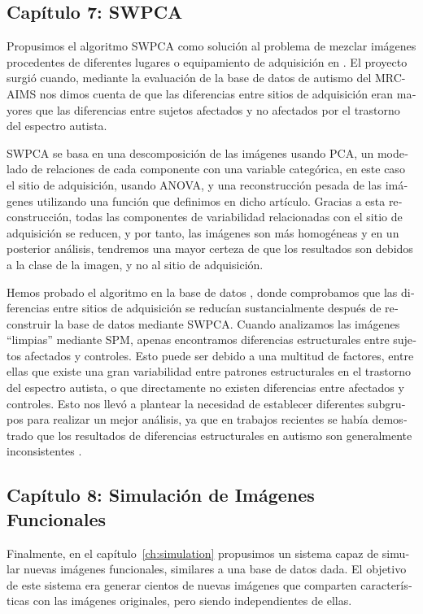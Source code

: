 \begin{otherlanguage}{spanish}
\subsection*{Capítulo 7: \acf{SWPCA}}
Propusimos el algoritmo \acf{SWPCA} como solución al problema de mezclar imágenes procedentes de diferentes lugares o equipamiento de adquisición en \cite{Martinez-Murcia2016a}. El proyecto surgió cuando, mediante la evaluación de la base de datos de autismo del \ac{MRC-AIMS} nos dimos cuenta de que las diferencias entre sitios de adquisición eran mayores que las diferencias entre sujetos afectados y no afectados por el trastorno del espectro autista. 

\acs{SWPCA} se basa en una descomposición de las imágenes usando \acs{PCA}, un modelado de relaciones de cada componente con una variable categórica, en este caso el sitio de adquisición, usando \acf{ANOVA}, y una reconstrucción pesada de las imágenes utilizando una función que definimos en dicho artículo. Gracias a esta reconstrucción, todas las componentes de variabilidad relacionadas con el sitio de adquisición se reducen, y por tanto, las imágenes son más homogéneas y en un posterior análisis, tendremos una mayor certeza de que los resultados son debidos a la clase de la imagen, y no al sitio de adquisición. 

Hemos probado el algoritmo en la base de datos \aimsmri{}, donde comprobamos que las diferencias entre sitios de adquisición se reducían sustancialmente después de reconstruir la base de datos mediante \ac{SWPCA}. Cuando analizamos las imágenes ``limpias'' mediante \acs{SPM}, apenas encontramos diferencias estructurales entre sujetos afectados y controles. Esto puede ser debido a una multitud de factores, entre ellas que existe una gran variabilidad entre patrones estructurales en el trastorno del espectro autista, o que directamente no existen diferencias entre afectados y controles. Esto nos llevó a plantear la necesidad de establecer diferentes subgrupos para realizar un mejor análisis, ya que en trabajos recientes se había demostrado que los resultados de diferencias estructurales en autismo son generalmente inconsistentes \cite{haar2014anatomical}. 

\subsection*{Capítulo 8: Simulación de Imágenes Funcionales}
Finalmente, en el capítulo~\ref{ch:simulation} propusimos un sistema capaz de simular nuevas imágenes funcionales, similares a una base de datos dada. El objetivo de este sistema era generar cientos de nuevas imágenes que comparten características con las imágenes originales, pero siendo independientes de ellas. 


\end{otherlanguage}
